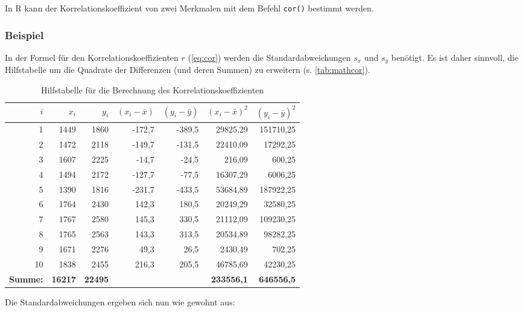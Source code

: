 \documentclass[
  ngerman,
]{article}
\begin{document}
\begin{rtip}
In R kann der Korrelationskoeffizient von zwei Merkmalen mit dem Befehl {\tt cor()} bestimmt werden.
\end{rtip}

\hypertarget{beispiel-25}{%
\subsubsection{Beispiel}\label{beispiel-25}}

In der Formel für den Korrelationskoeffizienten \(r\) (\autoref{eq:cor}) werden die Standardabweichungen \(s_x\) und \(s_y\) benötigt. Es ist daher sinnvoll, die Hilfstabelle um die Quadrate der Differenzen (und deren Summen) zu erweitern (s. \autoref{tab:mathcor}).

\begin{table}

\caption{\label{tab:unnamed-chunk-20}\label{tab:mathcor}Hilfstabelle für die Berechnung des Korrelationskoeffizienten}
\centering
\begin{tabular}[t]{rrrrrrr}
\toprule
$i$ & $x_i$ & $y_i$ & $(x_i-\bar{x})$ & $(y_i-\bar{y})$ & $(x_i-\bar{x})^2$ & $(y_i-\bar{y})^2$\\
\midrule
1 & 1449 & 1860 & -172,7 & -389,5 & 29825,29 & 151710,25\\
2 & 1472 & 2118 & -149,7 & -131,5 & 22410,09 & 17292,25\\
3 & 1607 & 2225 & -14,7 & -24,5 & 216,09 & 600,25\\
4 & 1494 & 2172 & -127,7 & -77,5 & 16307,29 & 6006,25\\
5 & 1390 & 1816 & -231,7 & -433,5 & 53684,89 & 187922,25\\
6 & 1764 & 2430 & 142,3 & 180,5 & 20249,29 & 32580,25\\
7 & 1767 & 2580 & 145,3 & 330,5 & 21112,09 & 109230,25\\
8 & 1765 & 2563 & 143,3 & 313,5 & 20534,89 & 98282,25\\
9 & 1671 & 2276 & 49,3 & 26,5 & 2430,49 & 702,25\\
10 & 1838 & 2455 & 216,3 & 205,5 & 46785,69 & 42230,25\\
\midrule
\textbf{Summe:} & \textbf{16217} & \textbf{22495} & \textbf{} & \textbf{} & \textbf{233556,1} & \textbf{646556,5}\\
\bottomrule
\end{tabular}
\end{table}

Die Standardabweichungen ergeben sich nun wie gewohnt aus:
\end{document}

